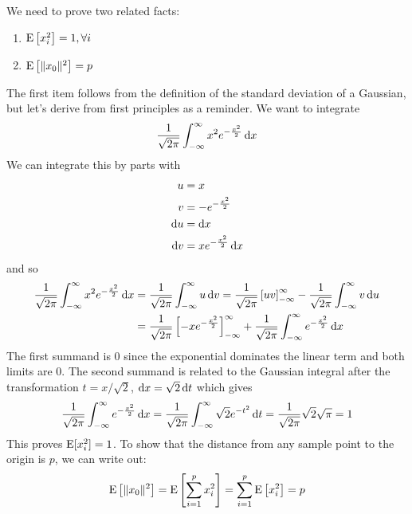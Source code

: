 We need to prove two related facts:
\begin{enumerate}
  \item{$\mathrm{E}\left[x_i^2\right] = 1, \forall i$}
  \item{$\mathrm{E}\left[\|x_0\|^2\right] = p$}
\end{enumerate}
The first item follows from the definition of the standard deviation of a Gaussian, but let's derive from first principles as a reminder. We want to integrate
\begin{align*}
  \frac{1}{\sqrt{2\pi}}\int_{-\infty}^{\infty} x^2 e^{-\frac{x^2}{2}}\operatorname{d}\!{x}
\end{align*}
We can integrate this by parts with
\begin{align*}
  u &= x\\
  v &= -e^{-\frac{x^2}{2}}\\
  \operatorname{d}\!{u} &= \operatorname{d}\!{x}\\
  \operatorname{d}\!{v} &= xe^{-\frac{x^2}{2}}\operatorname{d}\!{x}
\end{align*}
and so
\begin{align*}
  \frac{1}{\sqrt{2\pi}}\int_{-\infty}^{\infty} x^2 e^{-\frac{x^2}{2}}\operatorname{d}\!{x} &= \frac{1}{\sqrt{2\pi}}\int_{-\infty}^{\infty} u \operatorname{d}\!{v} =\frac{1}{\sqrt{2\pi}} \left[uv\right]_{-\infty}^{\infty} - \frac{1}{\sqrt{2\pi}}\int_{-\infty}^{\infty} v \operatorname{d}\!{u}\\
                                                                          &= \frac{1}{\sqrt{2\pi}} \left[-xe^{-\frac{x^2}{2}}\right]_{-\infty}^{\infty} + \frac{1}{\sqrt{2\pi}} \int_{-\infty}^{\infty} e^{-\frac{x^2}{2}}\operatorname{d}\!{x}
\end{align*}
The first summand is $0$ since the exponential dominates the linear term and both limits are $0$. The second summand is related to the Gaussian integral after the transformation $t = x / \sqrt{2}$, $\operatorname{d}\!{x} = \sqrt{2}\operatorname{d}\!{t}$ which gives
\begin{align*}
  \frac{1}{\sqrt{2\pi}} \int_{-\infty}^{\infty} e^{-\frac{x^2}{2}}\operatorname{d}\!{x} = \frac{1}{\sqrt{2\pi}} \int_{-\infty}^{\infty} \sqrt{2} e^{-t^2}\operatorname{d}\!{t} = \frac{1}{\sqrt{2\pi}} \sqrt{2}\sqrt{\pi} = 1
\end{align*}
This proves $\mathrm{E}[x_i^2] = 1$. To show that the distance from any sample point to the origin is $p$, we can write out:
$$
\mathrm{E}\left[\|x_0\|^2\right] = \mathrm{E}\left[\sum_{i=1}^p x_i^2\right] = \sum_{i = 1}^p \mathrm{E}\left[x_i^2\right] = p
$$
